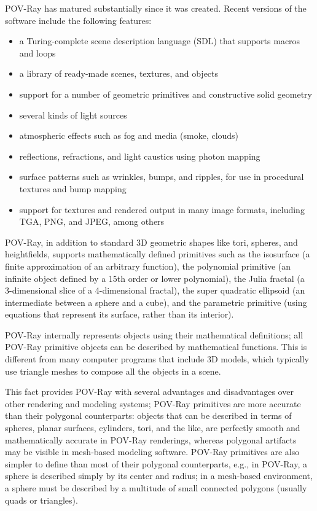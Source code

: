 \documentclass[runningheads]{llncs}
\begin{document}
    POV-Ray has matured substantially since it was created. Recent versions of the software include the following features:
    \begin{itemize}
        \item a Turing-complete scene description language (SDL) that supports macros and loops
        \item a library of ready-made scenes, textures, and objects
        \item support for a number of geometric primitives and constructive solid geometry
        \item several kinds of light sources
        \item atmospheric effects such as fog and media (smoke, clouds)
        \item reflections, refractions, and light caustics using photon mapping
        \item surface patterns such as wrinkles, bumps, and ripples, for use in procedural textures and bump mapping
        \item support for textures and rendered output in many image formats, including TGA, PNG, and JPEG, among others
    \end{itemize}
    
    POV-Ray, in addition to standard 3D geometric shapes like tori, spheres, and heightfields, supports mathematically defined primitives such as the isosurface (a finite approximation of an arbitrary function), the polynomial primitive (an infinite object defined by a 15th order or lower polynomial), the Julia fractal (a 3-dimensional slice of a 4-dimensional fractal), the super quadratic ellipsoid (an intermediate between a sphere and a cube), and the parametric primitive (using equations that represent its surface, rather than its interior).

    POV-Ray internally represents objects using their mathematical definitions; all POV-Ray primitive objects can be described by mathematical functions. This is different from many computer programs that include 3D models, which typically use triangle meshes to compose all the objects in a scene.
    
    This fact provides POV-Ray with several advantages and disadvantages over other rendering and modeling systems; POV-Ray primitives are more accurate than their polygonal counterparts: objects that can be described in terms of spheres, planar surfaces, cylinders, tori, and the like, are perfectly smooth and mathematically accurate in POV-Ray renderings, whereas polygonal artifacts may be visible in mesh-based modeling software. POV-Ray primitives are also simpler to define than most of their polygonal counterparts, e.g., in POV-Ray, a sphere is described simply by its center and radius; in a mesh-based environment, a sphere must be described by a multitude of small connected polygons (usually quads or triangles).
    
\end{document}
